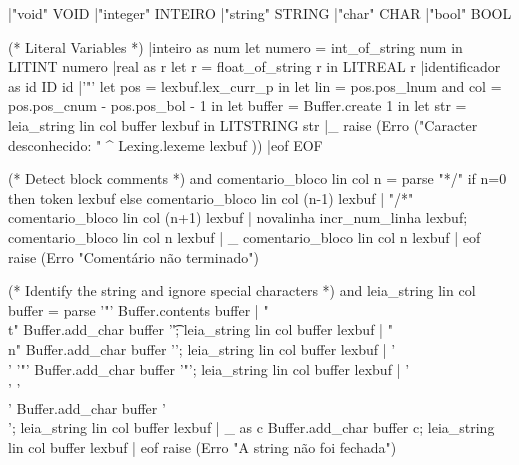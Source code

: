 \documentclass[12pt,a4paper,twoside]{article}
\begin{document}
\begin{terminal}
	|"void"			{	VOID	}
	|"integer"	{ INTEIRO }
	|"string"		{ STRING }
	|"char"			{ CHAR }
	|"bool"			{ BOOL }
	
	(* Literal Variables *)
	|inteiro as num { let numero = int_of_string num in LITINT numero }
	|real as r 		{let r = float_of_string r in LITREAL r}
	|identificador as id { ID id }
	|'"'			{ let pos = lexbuf.lex_curr_p in
					let lin = pos.pos_lnum
					and col = pos.pos_cnum - pos.pos_bol - 1 in
					let buffer = Buffer.create 1 in
					let str = leia_string lin col buffer lexbuf in
					LITSTRING str }
	|_ 				{ raise (Erro ("Caracter desconhecido: " ^ Lexing.lexeme lexbuf )) }
	|eof			{ EOF }

(* Detect block comments *)
and comentario_bloco lin col n = parse
	"*/"			{ if n=0 then token lexbuf
					else comentario_bloco lin col (n-1) lexbuf }
	| "/*"			{ comentario_bloco lin col (n+1) lexbuf }
	| novalinha 	{ incr_num_linha lexbuf; comentario_bloco lin col n lexbuf }
	| _				{ comentario_bloco lin col n lexbuf }
	| eof			{ raise (Erro "Comentário não terminado") }

(* Identify the string and ignore special characters *)
and leia_string lin col buffer = parse
	'"'{ Buffer.contents buffer}
		| "\\t"			{ Buffer.add_char buffer '\t'; leia_string lin col buffer lexbuf }
		| "\\n"			{ Buffer.add_char buffer '\n'; leia_string lin col buffer lexbuf }
		| '\\' '"' 	{ Buffer.add_char buffer '"'; leia_string lin col buffer lexbuf }
		| '\\' '\\' { Buffer.add_char buffer '\\'; leia_string lin col buffer lexbuf }
		| _ as c 		{ Buffer.add_char buffer c; leia_string lin col buffer lexbuf}
		| eof				{ raise (Erro "A string não foi fechada")}
\end{terminal}
\end{document}
